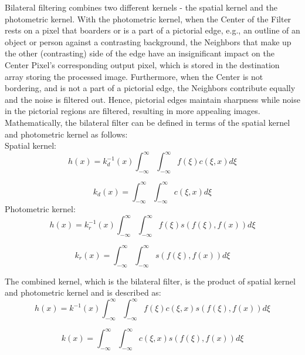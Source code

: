 \documentclass{IEEEtran}
\begin{document}
Bilateral filtering combines two different kernels - the spatial kernel and the photometric kernel. With the photometric kernel, when the Center of the Filter rests on a pixel that boarders or is a part of a pictorial edge, e.g., an outline of an object or person against a contrasting background, the Neighbors that make up the other (contrasting) side of the edge have an insignificant impact on the Center Pixel's corresponding output pixel, which is stored in the destination array storing the processed image. Furthermore, when the Center is not bordering, and is not a part of a pictorial edge, the Neighbors contribute equally and the noise is filtered out. Hence, pictorial edges maintain sharpness while noise in the pictorial regions are filtered, resulting in more appealing images. Mathematically, the bilateral filter can be defined in terms of the spatial kernel and photometric kernel as follows\cite{Tomasi1998}:\\

Spatial kernel: 
\begin{equation}
h(x)=k_{d}^{-1}(x)\int_{-\infty}^{\infty}\int_{-\infty}^{\infty}f(\xi)c(\xi,x)d\xi\label{spatial}
\end{equation}
 
\begin{equation}
k_{d}(x)=\int_{-\infty}^{\infty}\int_{-\infty}^{\infty}c(\xi,x)d\xi
\end{equation}
 Photometric kernel: 
\begin{equation}
h(x)=k_{r}^{-1}(x)\int_{-\infty}^{\infty}\int_{-\infty}^{\infty}f(\xi)s(f(\xi),f(x))d\xi\label{photometric}
\end{equation}
 
\begin{equation}
k_{r}(x)=\int_{-\infty}^{\infty}\int_{-\infty}^{\infty}s(f(\xi),f(x))d\xi
\end{equation}


The combined kernel, which is the bilateral filter, is the product
of spatial kernel and photometric kernel and is described as: 
\begin{equation}
h(x)=k^{-1}(x)\int_{-\infty}^{\infty}\int_{-\infty}^{\infty}f(\xi)c(\xi,x)s(f(\xi),f(x))d\xi\label{combined}
\end{equation}
 
\begin{equation}
k(x)=\int_{-\infty}^{\infty}\int_{-\infty}^{\infty}c(\xi,x)s(f(\xi),f(x))d\xi
\end{equation}
\end{document}
